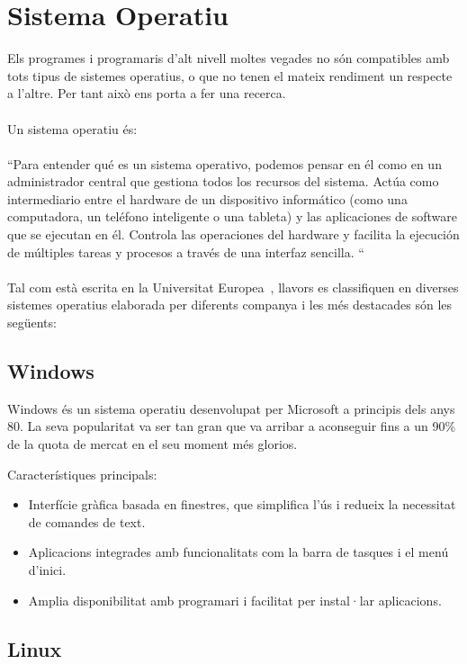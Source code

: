 \section{Sistema Operatiu}
Els programes i programaris d'alt nivell moltes vegades no són compatibles amb tots tipus de sistemes operatius, o que no tenen el mateix rendiment un respecte a l'altre. Per tant això ens porta a fer una recerca.\\ \\
Un sistema operatiu és:\\ \\
{\color{gray}``Para entender qué es un sistema operativo, podemos pensar en él como en un administrador central que gestiona todos los recursos del sistema. Actúa como intermediario entre el hardware de un dispositivo informático (como una computadora, un teléfono inteligente o una tableta) y las aplicaciones de software que se ejecutan en él. Controla las operaciones del hardware y facilita la ejecución de múltiples tareas y procesos a través de una interfaz sencilla. ``}\\ \\
 Tal com està escrita en la Universitat Europea~\cite{UniversitatEuropea}, llavors es classifiquen en diverses sistemes operatius elaborada per diferents companya i les més destacades són les següents:   

\subsection{Windows}

\label{subsec:Microsoft Windows}
Windows és un sistema operatiu desenvolupat per Microsoft a principis dels anys 80. La seva popularitat va ser tan gran que va arribar a aconseguir fins a un 90\% de la quota de mercat en el seu moment més glorios.

Característiques principals:
\begin{itemize}
 \item Interfície gràfica basada en finestres, que simplifica l'ús i redueix la necessitat de comandes de text.
 \item Aplicacions integrades amb funcionalitats com la barra de tasques i el menú d'inici.
 \item Amplia disponibilitat amb programari i facilitat per instal·lar aplicacions.
\end{itemize}

\subsection{Linux}

